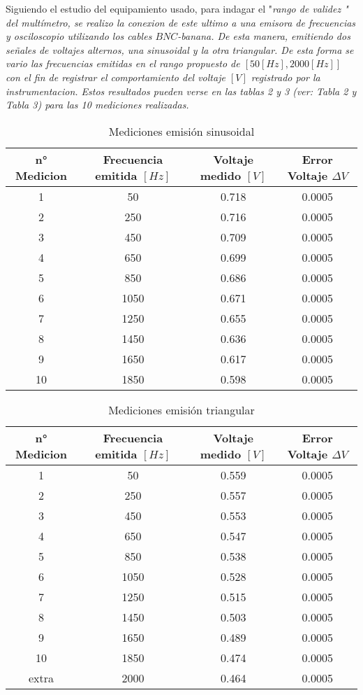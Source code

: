 Siguiendo el estudio del equipamiento usado, para indagar el "\it rango de validez \rm" del multímetro, se realizo
la conexion de este ultimo a una emisora de frecuencias y osciloscopio utilizando los cables $BNC$-banana. De esta
manera, emitiendo dos señales de voltajes alternos, una sinusoidal y la otra triangular. De esta forma se vario las
frecuencias emitidas en el rango propuesto de $[50[Hz], 2000[Hz]]$ con el fin de registrar el comportamiento del
voltaje $[V]$ registrado por la instrumentacion. Estos resultados pueden verse en las tablas 2 y 3 (ver: Tabla 2 y
Tabla 3) para las 10 mediciones realizadas.
{%
\begin{table}
    \begin{tabular}{|c|c|c|c|}
     \hline
        n° Medicion & Frecuencia emitida $[Hz]$ & Voltaje medido $[V]$ & Error Voltaje $\Delta V$\\ \hline
        1 & 50 & 0.718 & 0.0005 \\
        2 & 250 & 0.716 & 0.0005 \\
        3 & 450 & 0.709 & 0.0005 \\
        4 & 650 & 0.699 & 0.0005 \\
        5 & 850 & 0.686 & 0.0005 \\
        6 & 1050 & 0.671 & 0.0005 \\
        7 & 1250 & 0.655 & 0.0005 \\
        8 & 1450 & 0.636 & 0.0005 \\
        9 & 1650 & 0.617 & 0.0005 \\
        10 & 1850 & 0.598 & 0.0005 \\ \hline
    \end{tabular}
    \caption{Mediciones emisión sinusoidal}
\end{table}

\begin{table}
    \begin{tabular}{|c|c|c|c|}
     \hline
     n° Medicion & Frecuencia emitida $[Hz]$ & Voltaje medido $[V]$ & Error Voltaje $\Delta V$\\ \hline
     1 & 50 & 0.559 & 0.0005 \\
     2 & 250 & 0.557 & 0.0005 \\
     3 & 450 & 0.553 & 0.0005 \\
     4 & 650 & 0.547 & 0.0005 \\
     5 & 850 & 0.538 & 0.0005 \\
     6 & 1050 & 0.528 & 0.0005 \\
     7 & 1250 & 0.515 & 0.0005 \\
     8 & 1450 & 0.503 & 0.0005 \\
     9 & 1650 & 0.489 & 0.0005 \\
     10 & 1850 & 0.474 & 0.0005 \\
     extra & 2000 & 0.464 & 0.0005 \\ \hline
    \end{tabular}
    \caption{Mediciones emisión triangular}
\end{table}
}
